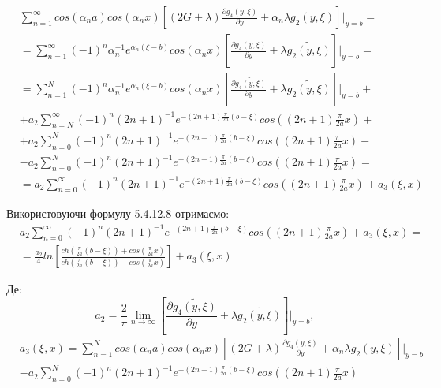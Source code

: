 \begin{align*}
    &\sum_{n=1}^{\infty} cos(\alpha_n a) cos(\alpha_n x) \left[(2G + \lambda) \frac{\partial g_4(y, \xi)}{\partial y} + \alpha_n \lambda g_2(y, \xi) \right]|_{y=b} = \\
    &= \sum_{n=1}^{\infty} (-1)^n \alpha_n^{-1} e^{\alpha_n (\xi - b)} cos(\alpha_n x) \left[ \frac{\partial \widetilde{g_4(y, \xi)}}{\partial y} + \lambda \widetilde{g_2(y, \xi)} \right]|_{y=b} = \\
    &= \sum_{n=1}^{N} (-1)^n \alpha_n^{-1} e^{\alpha_n (\xi - b)} cos(\alpha_n x) \left[ \frac{\partial \widetilde{g_4(y, \xi)}}{\partial y} + \lambda \widetilde{g_2(y, \xi)} \right]|_{y=b} + \\
    & + a_2 \sum_{n=N}^{\infty} (-1)^n (2n + 1)^{-1} e^{-(2n + 1) \frac{\pi}{2a} (b - \xi)} cos((2n + 1) \frac{\pi}{2a} x) + \\
    & + a_2 \sum_{n=0}^{N} (-1)^n (2n + 1)^{-1} e^{-(2n + 1) \frac{\pi}{2a} (b - \xi)} cos((2n + 1) \frac{\pi}{2a} x) - \\
    & - a_2 \sum_{n=0}^{N} (-1)^n (2n + 1)^{-1} e^{-(2n + 1) \frac{\pi}{2a} (b - \xi)} cos((2n + 1) \frac{\pi}{2a} x) = \\
    &= a_2 \sum_{n=0}^{\infty} (-1)^n (2n + 1)^{-1} e^{-(2n + 1) \frac{\pi}{2a} (b - \xi)} cos((2n + 1) \frac{\pi}{2a} x) + a_3(\xi, x)
\end{align*}

Використовуючи формулу 5.4.12.8 \cite{prudnikov} отримаємо:
\begin{align*}
    &a_2 \sum_{n=0}^{\infty} (-1)^n (2n + 1)^{-1} e^{-(2n + 1) \frac{\pi}{2a} (b - \xi)} cos((2n + 1) \frac{\pi}{2a} x) + a_3(\xi, x) = \\
    &= \frac{a_2}{4} ln\left[ \frac{ch(\frac{\pi}{2a}(b - \xi)) + cos(\frac{\pi}{2a}x)}{ch(\frac{\pi}{2a}(b - \xi)) - cos(\frac{\pi}{2a}x)} \right] + a_3(\xi, x)
\end{align*}

Де:
\begin{equation*}
    a_2 = \frac{2}{\pi} \lim_{n \rightarrow \infty}\left[ \frac{\partial \widetilde{g_4(y, \xi)}}{\partial y} + \lambda \widetilde{g_2(y, \xi)} \right]|_{y=b}, 
\end{equation*}
\begin{align*}
    &a_3(\xi, x) = \sum_{n=1}^{N} cos(\alpha_n a) cos(\alpha_n x) \left[(2G + \lambda) \frac{\partial g_4(y, \xi)}{\partial y} + \alpha_n \lambda g_2(y, \xi) \right]|_{y=b} - \\
    & - a_2 \sum_{n=0}^{N} (-1)^n (2n + 1)^{-1} e^{-(2n + 1) \frac{\pi}{2a} (b - \xi)} cos((2n + 1) \frac{\pi}{2a} x)
\end{align*}

